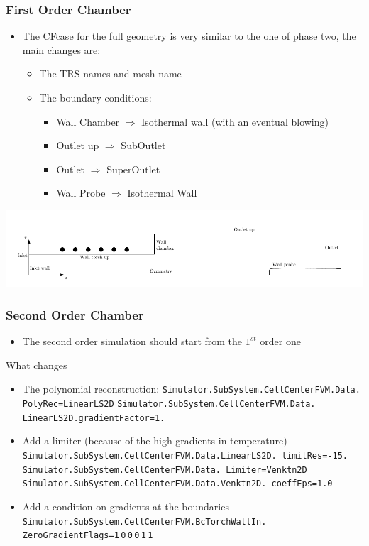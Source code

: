 \documentclass[compress,10pt]{beamer}
\begin{document}
\begin{frame}
\frametitle{First Order Chamber}
\begin{itemize}
 \item The CFcase for the full geometry is very similar to the one of phase two,
the main changes are:
\begin{itemize}
 \item The TRS names and mesh name
 \item The boundary conditions:
\begin{itemize}
 \item Wall Chamber $\Rightarrow$ Isothermal wall (with an eventual blowing)
 \item Outlet up $\Rightarrow$ SubOutlet
 \item Outlet $\Rightarrow$ SuperOutlet
 \item Wall Probe $\Rightarrow$ Isothermal Wall
\end{itemize}
\end{itemize}
\end{itemize}
\includegraphics[width=\textwidth,viewport= 10 10 450 80,clip]{geometry_compl.pdf}
  \end{frame}

\begin{frame}
\frametitle{Second Order Chamber}
\begin{itemize}
 \item The second order simulation should start from the $1^{st}$ order one
 \end{itemize}
\begin{block}{What changes}
\begin{itemize}
 \item The polynomial reconstruction:
\texttt{\small{Simulator.SubSystem.CellCenterFVM.Data.
\hspace*{5cm}PolyRec=LinearLS2D}}
\texttt{\small{Simulator.SubSystem.CellCenterFVM.Data.
\hspace*{5cm}LinearLS2D.gradientFactor=1.}}
\item Add a limiter (because of the high gradients in temperature)
\texttt{\small{Simulator.SubSystem.CellCenterFVM.Data.LinearLS2D.
\hspace*{5cm}limitRes=-15.}}
\texttt{\small{Simulator.SubSystem.CellCenterFVM.Data.
\hspace*{5cm}Limiter=Venktn2D}}
\texttt{\small{Simulator.SubSystem.CellCenterFVM.Data.Venktn2D.
\hspace*{5cm}coeffEps=1.0}}
\item Add a condition on gradients at the boundaries
\texttt{\small{Simulator.SubSystem.CellCenterFVM.BcTorchWallIn.
\hspace*{5cm}ZeroGradientFlags=1$\,$0$\,$0$\,$0$\,$1$\,$1}}
\end{itemize}
\end{block}
\end{frame}
\end{document}
